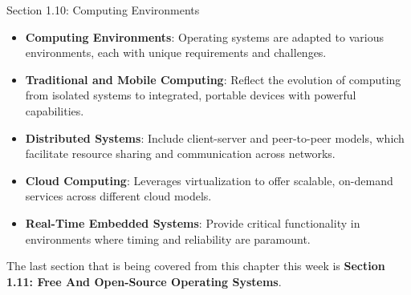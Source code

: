 \begin{notes}{Section 1.10: Computing Environments}
\begin{highlight}
    \end{highlight}
    
    \begin{highlight}
    
    \begin{itemize}
        \item \textbf{Computing Environments}: Operating systems are adapted to various environments, each with unique requirements and challenges.
        \item \textbf{Traditional and Mobile Computing}: Reflect the evolution of computing from isolated systems to integrated, portable devices with powerful capabilities.
        \item \textbf{Distributed Systems}: Include client-server and peer-to-peer models, which facilitate resource sharing and communication across networks.
        \item \textbf{Cloud Computing}: Leverages virtualization to offer scalable, on-demand services across different cloud models.
        \item \textbf{Real-Time Embedded Systems}: Provide critical functionality in environments where timing and reliability are paramount.
    \end{itemize}

    \end{highlight}
\end{notes}

The last section that is being covered from this chapter this week is \textbf{Section 1.11: Free And Open-Source Operating Systems}.

